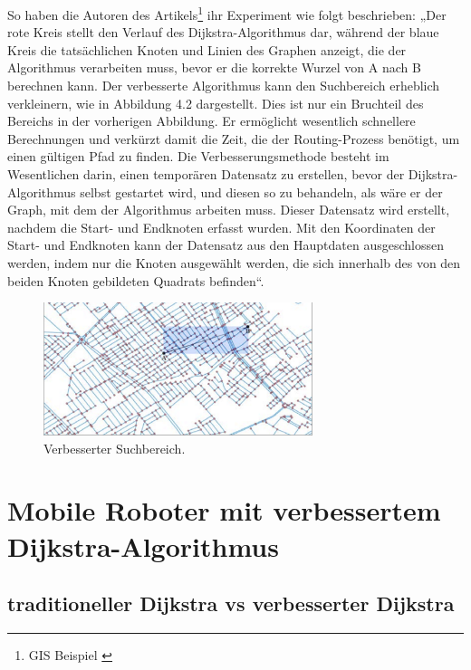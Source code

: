 So haben die Autoren des Artikels\footnote{GIS Beispiel \cite{Research-id11}}  ihr Experiment wie folgt beschrieben:
\newline
\newline
 „Der rote Kreis stellt den Verlauf des Dijkstra-Algorithmus dar, während der blaue Kreis die tatsächlichen Knoten und Linien des Graphen anzeigt, die der Algorithmus verarbeiten muss, bevor er die korrekte Wurzel von A nach B berechnen kann. Der verbesserte Algorithmus kann den Suchbereich erheblich verkleinern, wie in Abbildung 4.2 dargestellt. Dies ist nur ein Bruchteil des Bereichs in der vorherigen Abbildung. Er ermöglicht wesentlich schnellere Berechnungen und verkürzt damit die Zeit, die der Routing-Prozess benötigt, um einen gültigen Pfad zu finden. Die Verbesserungsmethode besteht im Wesentlichen darin, einen temporären Datensatz zu erstellen, bevor der Dijkstra-Algorithmus selbst gestartet wird, und diesen so zu behandeln, als wäre er der Graph, mit dem der Algorithmus arbeiten muss. Dieser Datensatz wird erstellt, nachdem die Start- und Endknoten erfasst wurden. Mit den Koordinaten der Start- und Endknoten kann der Datensatz aus den Hauptdaten ausgeschlossen werden, indem nur die Knoten ausgewählt werden, die sich innerhalb des von den beiden Knoten gebildeten Quadrats befinden“.

\begin{figure}[H]
	\centering
	\includegraphics[width=0.7\textwidth]{images/GIS_blue.PNG}
	\caption{\label{fig:GIS_red}Verbesserter Suchbereich\cite{Research-id11}.}
\end{figure}

\section{Mobile Roboter mit verbessertem Dijkstra-Algorithmus}
\subsection{traditioneller Dijkstra vs verbesserter Dijkstra }

